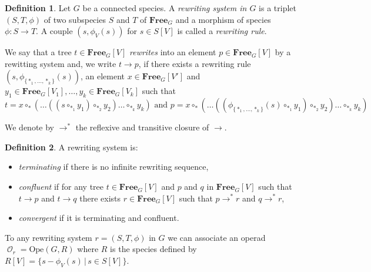 \documentclass[a4paper]{article}
\DeclareMathOperator{\op}{\mathcal{O}}
\theoremstyle{definition}
\newtheorem{definition}{Definition}
\newcommand{\K}{\mathbb{K}}
\newcommand{\FreeOp}{\mathbf{Free}}
\begin{document}
\begin{definition}
Let $G$ be a connected species. A \textit{rewriting system in $G$} is a triplet 
$(S,T,\phi)$ of two subspecies $S$ and $T$ of $\FreeOp_G$ and a morphism of species 
$\phi : S\rightarrow T$. A couple $(s,\phi_V(s))$ for $s\in S[V]$ is called a \textit{rewriting rule}.

We say that a tree $t\in \FreeOp_G[V]$ \textit{rewrites} into an element 
$p \in \FreeOp_G[V]$ by a rewitting system and, we write $t\rightarrow p$, if there 
exists a rewriting rule $(s,\phi_{\{\ast_1,\dots,\ast_k\}}(s))$, an element 
$x\in \FreeOp_G[V']$ and $y_1\in \FreeOp_G[V_1],\dots, y_k\in\FreeOp_G[V_k]$ 
such that 
$$
	t = x\circ_{\ast}(\dots((s\circ_{\ast_1}y_1)\circ_{\ast_2}y_2)\dots\circ_{\ast_k}y_k)\text{ and }
	p = x\circ_{\ast}(\dots((\phi_{\{\ast_1,\dots,\ast_k\}}(s)\circ_{\ast_1}y_1)\circ_{\ast_2}y_2)\dots\circ_{\ast_k}y_k)
$$

We denote by $\rightarrow^*$ the reflexive and transitive closure of $\rightarrow$.
\end{definition}

\begin{definition}
A rewriting system is:
\begin{itemize}
	\item \textit{terminating} if there is no infinite rewriting sequence,
	\item \textit{confluent} if for any tree $t\in\FreeOp_G[V]$ and $p$ and 
	$q$ in $\FreeOp_G[V]$ such that $t\rightarrow p$ and $t\rightarrow q$ 
	there exists $r\in\FreeOp_G[V]$ such that $p\rightarrow^* r$ and $q\rightarrow^* r$,
	\item \textit{convergent} if it is terminating and confluent.
\end{itemize}
\end{definition}

To any rewriting system $r=(S,T,\phi)$ in $G$ we can associate an operad 
$\op_r=\text{Ope}(G,R)$ where $R$ is the species defined by $R[V]=\{s-\phi_V(s)\,|\, s\in S[V]\}$.
\end{document}

